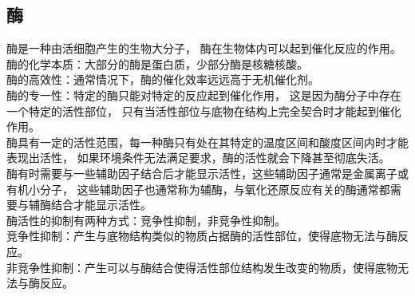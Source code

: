 \documentclass[UTF8]{ctexart}
\begin{document}
\subsection{酶}
    酶是一种由活细胞产生的生物大分子，
    酶在生物体内可以起到催化反应的作用。\\[3mm]
    酶的化学本质：大部分的酶是蛋白质，少部分酶是核糖核酸。\\[3mm]
    酶的高效性：通常情况下，酶的催化效率远远高于无机催化剂。\\[3mm]
    酶的专一性：特定的酶只能对特定的反应起到催化作用，
    这是因为酶分子中存在一个特定的活性部位，
    只有当活性部位与底物在结构上完全契合时才能起到催化作用。\\[3mm]
    酶具有一定的活性范围，每一种酶只有处在其特定的温度区间和酸度区间内时才能表现出活性，
    如果环境条件无法满足要求，酶的活性就会下降甚至彻底失活。\\[3mm]
    酶有时需要与一些辅助因子结合后才能显示活性，这些辅助因子通常是金属离子或有机小分子，
    这些辅助因子也通常称为辅酶，与氧化还原反应有关的酶通常都需要与辅酶结合才能显示活性。\\[3mm]
    酶活性的抑制有两种方式：竞争性抑制，非竞争性抑制。\\[3mm]
    竞争性抑制：产生与底物结构类似的物质占据酶的活性部位，使得底物无法与酶反应。\\[3mm]
    非竞争性抑制：产生可以与酶结合使得活性部位结构发生改变的物质，使得底物无法与酶反应。

\newpage
    
\end{document}
